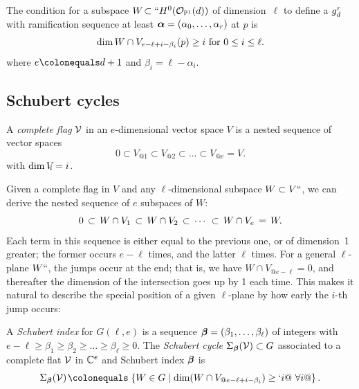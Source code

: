 \begin{proposition}\label{ramification1}
\!The condition for a subspace $W\!\subset``H^{0}(\sO_{\PP^{1}}(d))\mskip1mu$
of dimension~$\ell$
to define a $\grd$ with ramification sequence at least $\balpha
=(\alpha_{0},\dots, \alpha_{r})$ at $p$ is
$$
\dim W\cap V_{e-\ell+i-\beta_{i}}(p)\geq  i \hbox{ for } 0\leq i \leq
\ell.
$$
where $e\colonequals d+1$ and $\beta_{i} = \ell-\alpha_{i}$.
\end{proposition}

\subsection*{Schubert cycles}

\begin{definition}
A \emph{complete flag} $\cal V$  in an $e$-dimensional vector space $V$
%
is a nested sequence of vector spaces
$$
0 \subset V_{@1} \subset V_{@2} \subset \dots  \subset V_{@e} = V.
$$
with $\dim V_{\mskip-5mu i} = i$.
\end{definition}

Given a complete flag
in $V$ and any  $\ell$-dimensional subspace 
$W \subset V` `$, we can derive the nested sequence of $e$ subspaces of $W$:
$$
\let\;\,
0 \; \subset \; W \cap V_1 \; \subset \;  W \cap V_2 \; \subset \;
\cdots \;  \; \subset \;  W \cap V_{e} \,=\, W
.
$$
Each term in this sequence is either equal to the 
previous
one, or of
dimension~1 greater; the former  occurs $e-\ell$ times, and the latter
$\ell$ times. For a general $\ell $-plane $W` `$, the jumps occur
at the end; that is, we have $W \cap V_{@e-\ell} = 0$, and thereafter
the dimension of the intersection goes up by 1 each time. This makes
it natural
to describe the special position of a given $\ell $-plane by how early
the $i$-th jump occurs:

\begin{definition}
A \emph{Schubert index} for $G(\ell, e)$ is a sequence ${\bbeta} =
(\beta_1,\dots,\beta_{\ell})$ of integers with $e-\ell \geq \beta_1 \geq
\beta_2 \geq \dots \geq \beta_{\ell} \geq 0$.
The \emph{Schubert cycle $\Sigma_{\bbeta}({\cal V}) \subset G$} associated
\label{Schubert1}
to a complete flat $\sV$ in $\CC^e$ and
Schubert index $\bbeta$  is
$$
\Sigma_{\bbeta}({\cal V}) \; \colonequals  \; \left\{ W \in G \mid \dim(W
\cap V_{@e-\ell+i-\beta_i}) \geq `i @\  \forall i@\right\} .
$$
\end{definition}

